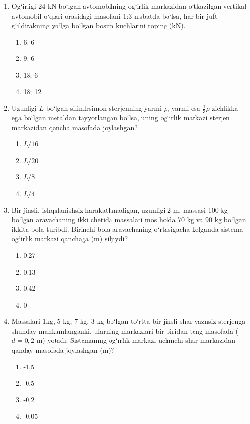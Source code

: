 \begin{enumerate}
\item Og‘irligi 24 kN bo‘lgan avtomobilning og‘irlik markazidan o‘tkazilgan vertikal avtomobil o‘qlari orasidagi masofani 1:3 nisbatda bo‘lsa, har bir juft g‘ildirakning yo‘lga bo‘lgan bosim kuchlarini toping (kN).
\begin{enumerate}[label=\Alph*)]
\item 6; 6
\item 9; 6
\item 18; 6
\item 18; 12
\end{enumerate}

\item Uzunligi $L$ bo‘lgan silindrsimon sterjenning yarmi $\rho$, yarmi esa $\frac{1}{3}\rho$ zichlikka ega bo‘lgan metaldan tayyorlangan bo‘lsa, uning og‘irlik markazi sterjen markazidan qancha masofada joylashgan?
\begin{enumerate}[label=\Alph*)]
\item $L/16$
\item $L/20$
\item $L/8$
\item $L/4$
\end{enumerate}

\item Bir jinsli, ishqalanishsiz harakatlanadigan, uzunligi 2 m, massasi 100 kg bo‘lgan aravachaning ikki chetida massalari mos holda 70 kg va 90 kg bo‘lgan ikkita bola turibdi. Birinchi bola aravachaning o‘rtasigacha kelganda sistema og‘irlik markazi qanchaga (m) siljiydi?
\begin{enumerate}[label=\Alph*)]
\item 0,27
\item 0,13
\item 0,42
\item 0
\end{enumerate}

\item Massalari 1kg, 5 kg, 7 kg, 3 kg bo‘lgan to‘rtta bir jinsli shar vaznsiz sterjenga shunday mahkamlanganki, ularning markazlari bir-biridan teng masofada ($d = 0,2$ m) yotadi. Sistemaning og‘irlik markazi uchinchi shar markazidan qanday masofada joylashgan (m)?
\begin{enumerate}[label=\Alph*)]
\item -1,5
\item -0,5
\item -0,2
\item -0,05
\end{enumerate}


\end{enumerate}
